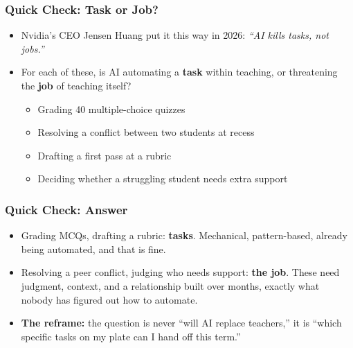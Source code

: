\begin{frame}[fragile]\frametitle{Quick Check: Task or Job?}
\begin{itemize}
\item Nvidia's CEO Jensen Huang put it this way in 2026: \emph{``AI kills tasks, not jobs.''}
\item For each of these, is AI automating a \textbf{task} within teaching, or threatening the \textbf{job} of teaching itself?
\begin{itemize}
\item Grading 40 multiple-choice quizzes
\item Resolving a conflict between two students at recess
\item Drafting a first pass at a rubric
\item Deciding whether a struggling student needs extra support
\end{itemize}
\end{itemize}
\end{frame}

\begin{frame}[fragile]\frametitle{Quick Check: Answer}
\begin{itemize}
\item Grading MCQs, drafting a rubric: \textbf{tasks}. Mechanical, pattern-based, already being automated, and that is fine.
\item Resolving a peer conflict, judging who needs support: \textbf{the job}. These need judgment, context, and a relationship built over months, exactly what nobody has figured out how to automate.
\item \textbf{The reframe:} the question is never ``will AI replace teachers,'' it is ``which specific tasks on my plate can I hand off this term.''
\end{itemize}
\end{frame}
